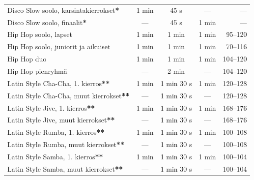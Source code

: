 \documentclass[12pt, a4paper, oneside]{article}
\begin{document}
\begin{table}[ht]
\begin{tabular}{@{\hspace{0.25cm}}lcccr@{\hspace{0.25cm}}}
        Disco Slow soolo, karsintakierrokset\textbf{*}  & 1 min               & 45 s                 & ---                    & ---            \\
        Disco Slow soolo, finaalit\textbf{*}            & ---                 & 45 s                 & 1 min                  & ---            \\ \midrule
        Hip Hop soolo, lapset                           & 1 min               & 1 min                & 1 min                  & 95--120        \\
        Hip Hop soolo, juniorit ja aikuiset             & 1 min               & 1 min                & 1 min                  & 70--116        \\
        Hip Hop duo                                     & 1 min               & 1 min                & 1 min                  & 104--120       \\
        Hip Hop pienryhmä                               & ---                 & 2 min                & ---                    & 104--120       \\ \midrule
        Latin Style Cha-Cha, 1. kierros\textbf{**}      & 1 min               & 1 min 30 s           & 1 min                  & 120--128        \\
        Latin Style Cha-Cha, muut kierrokset\textbf{**} & ---                 & 1 min 30 s           & ---                    & 120--128        \\
        Latin Style Jive, 1. kierros\textbf{**}         & 1 min               & 1 min 30 s           & 1 min                  & 168--176        \\
        Latin Style Jive, muut kierrokset\textbf{**}    & ---                 & 1 min 30 s           & ---                    & 168--176        \\
        Latin Style Rumba, 1. kierros\textbf{**}        & 1 min               & 1 min 30 s           & 1 min                  & 100--108        \\
        Latin Style Rumba, muut kierrokset\textbf{**}   & ---                 & 1 min 30 s           & ---                    & 100--108        \\
        Latin Style Samba, 1. kierros\textbf{**}        & 1 min               & 1 min 30 s           & 1 min                  & 100--104        \\
        Latin Style Samba, muut kierrokset\textbf{**}   & ---                 & 1 min 30 s           & ---                    & 100--104        \\ \bottomrule
    \end{tabular}
\end{table}
\end{document}
